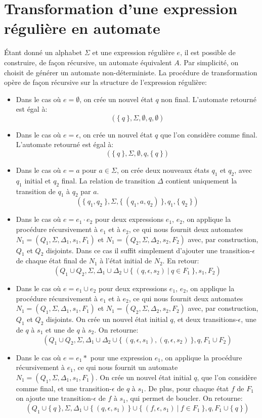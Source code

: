 \section{Transformation d'une expression régulière en automate}

Étant donné un alphabet $\Sigma$ et une expression régulière $e$, il est possible de construire, de façon récursive, un automate équivalent $A$.
Par simplicité, on choisit de générer un automate non-déterministe.
La procédure de transformation opère de façon récursive sur la structure de l'expression régulière:
\begin{itemize}
\item Dans le cas où $e = \emptyset$, on crée un nouvel état $q$ non final. L'automate retourné est égal à:
\[
(\{\ q\ \}, \Sigma, \emptyset, q, \emptyset)
\] 
\item Dans le cas où $e = \epsilon$, on crée un nouvel état $q$ que l'on considère comme final. L'automate retourné est égal à:
\[
(\{\ q\ \}, \Sigma, \emptyset, q, \{\ q\ \})
\]
\item Dans le cas où $e = a$ pour $a \in \Sigma$, on crée deux nouveaux états $q_1$ et $q_2$, avec $q_1$ initial et $q_2$ final.
La relation de transition $\Delta$ contient uniquement la transition de $q_1$ à $q_2$ par $a$.
\[
(\{\ q_1, q_2\ \}, \Sigma, \{\ (q_1, a, q_2)\ \}, q_1, \{\ q_2\ \})
\]
\item Dans le cas où $e = e_1 \cdot e_2$ pour deux expressions $e_1$, $e_2$, on applique la procédure récursivement à $e_1$ et à $e_2$, ce qui nous fournit deux automates $N_1 = (Q_1, \Sigma, \Delta_1, s_1, F_1)$ et $N_1 = (Q_2, \Sigma, \Delta_2, s_2, F_2)$ avec, par construction, $Q_1$ et $Q_2$ disjoints. Dans ce cas il suffit simplement d'ajouter une transition-$\epsilon$ de chaque état final de $N_1$ à l'état initial de $N_2$. En retour:
\[
(Q_1 \cup Q_2, \Sigma, \Delta_1 \cup \Delta_2 \cup \{\ (q, \epsilon, s_2)\ |\ q \in F_1\ \}, s_1, F_2)
\]
\item Dans le cas où $e = e_1 \cup e_2$ pour deux expressions $e_1$, $e_2$, on applique la procédure récursivement à $e_1$ et à $e_2$, ce qui nous fournit deux automates $N_1 = (Q_1, \Sigma, \Delta_1, s_1, F_1)$ et $N_1 = (Q_2, \Sigma, \Delta_2, s_2, F_2)$ avec, par construction, $Q_1$ et $Q_2$ disjoints.
On crée un nouvel état initial $q$, et deux transitions-$\epsilon$, une de $q$ à $s_1$ et une de $q$ à $s_2$. On retourne:
\[
(Q_1 \cup Q_2, \Sigma, \Delta_1 \cup \Delta_2 \cup \{\ (q, \epsilon, s_1), (q, \epsilon, s_2)\ \}, q, F_1 \cup F_2)
\]
\item Dans le cas où $e = e_1*$ pour une expression $e_1$, on applique la procédure récursivement à $e_1$, ce qui nous fournit un automate $N_1 = (Q_1, \Sigma, \Delta_1, s_1, F_1)$.
On crée un nouvel état initial $q$, que l'on considère comme final, et une transition-$\epsilon$ de $q$ à $s_1$. De plus, pour chaque état $f$ de $F_1$ on ajoute une transition-$\epsilon$ de $f$ à $s_1$, qui permet de boucler. On retourne:
\[
(Q_1 \cup \{\ q\ \}, \Sigma, \Delta_1 \cup \{\ (q, \epsilon, s_1)\ \} \cup \{\ (f, \epsilon, s_1)\ |\ f \in F_1\ \}, q, F_1 \cup \{\ q\ \})
\]
\end{itemize}

